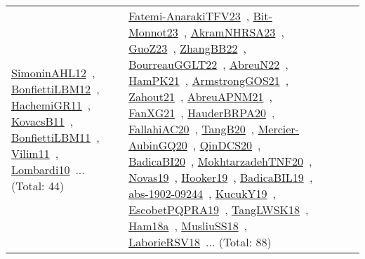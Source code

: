 {\begin{longtable}{lp{3cm}>{\raggedright\arraybackslash}p{6cm}>{\raggedright\arraybackslash}p{6cm}>{\raggedright\arraybackslash}p{8cm}}
\href{works/SimoninAHL12.pdf}{SimoninAHL12}~\cite{SimoninAHL12}, \href{works/BonfiettiLBM12.pdf}{BonfiettiLBM12}~\cite{BonfiettiLBM12}, \href{works/HachemiGR11.pdf}{HachemiGR11}~\cite{HachemiGR11}, \href{works/KovacsB11.pdf}{KovacsB11}~\cite{KovacsB11}, \href{works/BonfiettiLBM11.pdf}{BonfiettiLBM11}~\cite{BonfiettiLBM11}, \href{works/Vilim11.pdf}{Vilim11}~\cite{Vilim11}, \href{works/Lombardi10.pdf}{Lombardi10}~\cite{Lombardi10}... (Total: 44) & \href{works/Fatemi-AnarakiTFV23.pdf}{Fatemi-AnarakiTFV23}~\cite{Fatemi-AnarakiTFV23}, \href{works/Bit-Monnot23.pdf}{Bit-Monnot23}~\cite{Bit-Monnot23}, \href{works/AkramNHRSA23.pdf}{AkramNHRSA23}~\cite{AkramNHRSA23}, \href{works/GuoZ23.pdf}{GuoZ23}~\cite{GuoZ23}, \href{works/ZhangBB22.pdf}{ZhangBB22}~\cite{ZhangBB22}, \href{works/BourreauGGLT22.pdf}{BourreauGGLT22}~\cite{BourreauGGLT22}, \href{works/AbreuN22.pdf}{AbreuN22}~\cite{AbreuN22}, \href{works/HamPK21.pdf}{HamPK21}~\cite{HamPK21}, \href{works/ArmstrongGOS21.pdf}{ArmstrongGOS21}~\cite{ArmstrongGOS21}, \href{works/Zahout21.pdf}{Zahout21}~\cite{Zahout21}, \href{works/AbreuAPNM21.pdf}{AbreuAPNM21}~\cite{AbreuAPNM21}, \href{works/FanXG21.pdf}{FanXG21}~\cite{FanXG21}, \href{works/HauderBRPA20.pdf}{HauderBRPA20}~\cite{HauderBRPA20}, \href{works/FallahiAC20.pdf}{FallahiAC20}~\cite{FallahiAC20}, \href{works/TangB20.pdf}{TangB20}~\cite{TangB20}, \href{works/Mercier-AubinGQ20.pdf}{Mercier-AubinGQ20}~\cite{Mercier-AubinGQ20}, \href{works/QinDCS20.pdf}{QinDCS20}~\cite{QinDCS20}, \href{works/BadicaBI20.pdf}{BadicaBI20}~\cite{BadicaBI20}, \href{works/MokhtarzadehTNF20.pdf}{MokhtarzadehTNF20}~\cite{MokhtarzadehTNF20}, \href{works/Novas19.pdf}{Novas19}~\cite{Novas19}, \href{works/Hooker19.pdf}{Hooker19}~\cite{Hooker19}, \href{works/BadicaBIL19.pdf}{BadicaBIL19}~\cite{BadicaBIL19}, \href{works/abs-1902-09244.pdf}{abs-1902-09244}~\cite{abs-1902-09244}, \href{works/KucukY19.pdf}{KucukY19}~\cite{KucukY19}, \href{works/EscobetPQPRA19.pdf}{EscobetPQPRA19}~\cite{EscobetPQPRA19}, \href{works/TangLWSK18.pdf}{TangLWSK18}~\cite{TangLWSK18}, \href{works/Ham18a.pdf}{Ham18a}~\cite{Ham18a}, \href{works/MusliuSS18.pdf}{MusliuSS18}~\cite{MusliuSS18}, \href{works/LaborieRSV18.pdf}{LaborieRSV18}~\cite{LaborieRSV18}... (Total: 88)\\

\end{longtable}}
